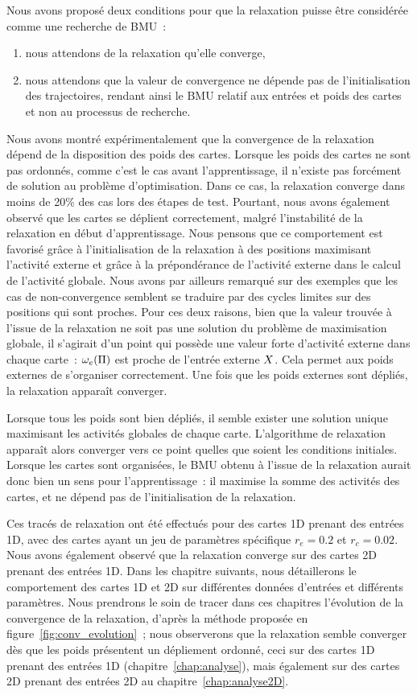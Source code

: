 \documentclass[../main]{subfiles}
\begin{document}
Nous avons proposé deux conditions pour que la relaxation puisse être considérée comme une recherche de BMU~: 
\begin{enumerate}
	\item nous attendons de la relaxation qu'elle converge,
	\item nous attendons que la valeur de convergence ne dépende pas de l'initialisation des trajectoires, rendant ainsi le BMU relatif aux entrées et poids des cartes et non au processus de recherche.
\end{enumerate}

Nous avons montré expérimentalement que la convergence de la relaxation dépend de la disposition des poids des cartes. Lorsque les poids des cartes ne sont pas ordonnés, comme c'est le cas avant l'apprentissage, il n'existe pas forcément de solution au problème d'optimisation. 
Dans ce cas, la relaxation converge dans moins de 20\% des cas lors des étapes de test.
Pourtant, nous avons également observé que les cartes se déplient correctement, malgré l'instabilité de la relaxation en début d'apprentissage. Nous pensons que ce comportement est favorisé grâce à l'initialisation de la relaxation à des positions maximisant l'activité externe et grâce à la prépondérance de l'activité externe dans le calcul de l'activité globale. Nous avons par ailleurs remarqué sur des exemples que les cas de non-convergence semblent se traduire par des cycles limites sur des positions qui sont proches. 
Pour ces deux raisons, bien que la valeur trouvée à l'issue de la relaxation ne soit pas une solution du problème de maximisation globale, il s'agirait d'un point qui possède une valeur forte d'activité externe dans chaque carte~: $\omega_e(\Pi)$ est proche de l'entrée externe $X$. Cela permet aux poids externes de s'organiser correctement. Une fois que les poids externes sont dépliés, la relaxation apparaît converger.


Lorsque tous les poids sont bien dépliés, il semble exister une solution unique maximisant les activités globales de chaque carte. L'algorithme de relaxation apparaît alors converger vers ce point quelles que soient les conditions initiales.
Lorsque les cartes sont organisées, le BMU obtenu à l'issue de la relaxation aurait donc bien un sens pour l'apprentissage~: il maximise la somme des activités des cartes, et ne dépend pas de l'initialisation de la relaxation.


Ces tracés de relaxation ont été effectués pour des cartes 1D prenant des entrées 1D, avec des cartes ayant un jeu de paramètres spécifique $r_e = 0.2$ et $r_c = 0.02$. Nous avons également observé que la relaxation converge sur des cartes 2D prenant des entrées 1D.
Dans les chapitre suivants, nous détaillerons le comportement des cartes 1D et 2D sur différentes données d'entrées et différents paramètres. Nous prendrons le soin de tracer dans ces chapitres l'évolution de la convergence de la relaxation, d'après la méthode proposée en figure~\ref{fig:conv_evolution}~; nous observerons que la relaxation semble converger dès que les poids présentent un dépliement ordonné, ceci sur des cartes 1D prenant des entrées 1D (chapitre~\ref{chap:analyse}), mais également sur des cartes 2D prenant des entrées 2D au chapitre~\ref{chap:analyse2D}.

\ifSubfilesClassLoaded{
    \printbibliography
}{}
\end{document}
